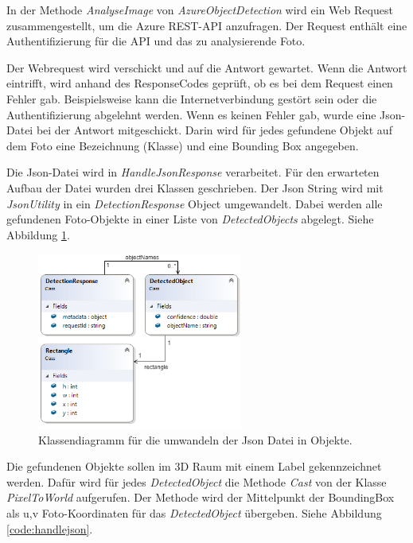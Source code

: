 In der Methode \textit{AnalyseImage} von \textit{AzureObjectDetection} wird ein Web Request zusammengestellt, um die Azure REST-API anzufragen. Der Request enthält eine Authentifizierung für die API und das zu analysierende Foto. %

Der Webrequest wird verschickt und auf die Antwort gewartet. Wenn die Antwort eintrifft, wird anhand des ResponseCodes geprüft, ob es bei dem Request einen Fehler gab. Beispielsweise kann die Internetverbindung gestört sein oder die Authentifizierung abgelehnt werden. Wenn es keinen Fehler gab, wurde eine Json-Datei bei der Antwort mitgeschickt. Darin wird für jedes gefundene Objekt auf dem Foto eine Bezeichnung (Klasse) und eine Bounding Box angegeben. 

Die Json-Datei wird in \textit{HandleJsonResponse} verarbeitet. Für den erwarteten Aufbau der Datei wurden drei Klassen geschrieben. Der Json String wird mit \textit{JsonUtility} in ein \textit{DetectionResponse} Object umgewandelt. Dabei werden alle gefundenen Foto-Objekte in einer Liste von \textit{DetectedObjects} abgelegt. Siehe Abbildung \ref{dia:jsonClasses}. \citep{fromjson}

\begin{figure}[H]
	\centering
	\includegraphics[width=0.6\textwidth]{images/dia_json.PNG}
	\caption[Klassendiagramm für Json umwandelung]{Klassendiagramm für die umwandeln der Json Datei in Objekte.}
	\label{dia:jsonClasses}
\end{figure}

Die gefundenen Objekte sollen im 3D Raum mit einem Label gekennzeichnet werden. 
Dafür wird für jedes \textit{DetectedObject} die Methode \textit{Cast} von der Klasse \textit{PixelToWorld} aufgerufen. Der Methode wird der Mittelpunkt der BoundingBox als u,v Foto-Koordinaten für das \textit{DetectedObject} übergeben. Siehe Abbildung \ref{code:handlejson}.

